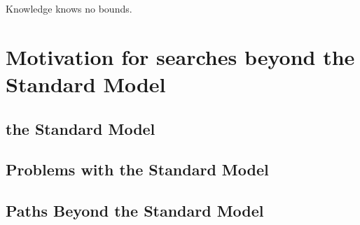 \begin{savequote}[75mm]
Knowledge knows no bounds.
\end{savequote}

\chapter{Motivation for searches beyond the Standard Model}


\section{the Standard Model}
\section{Problems with the Standard Model}
\section{Paths Beyond the Standard Model}